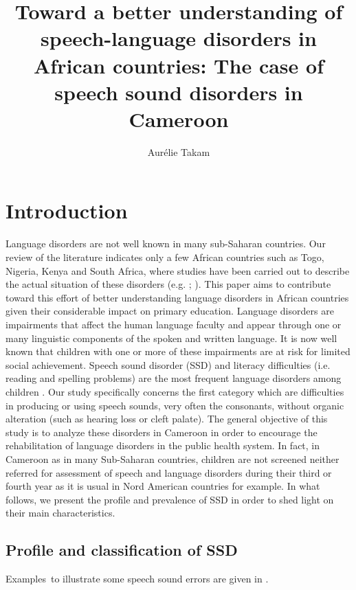 \documentclass[output=paper,newtxmath,modfonts,nonflat,draftmode]{langsci/langscibook}
\author{Aurélie Takam\affiliation{Department of African Languages and Linguistics, University of Yaoundé 1\newline Department of French studies, York University}}
\title{Toward a better understanding of speech-language disorders in African countries: The case of speech sound disorders in Cameroon}
\begin{document}
 
\maketitle


\section{Introduction} %

Language disorders are not well known in many sub-Saharan countries. Our review of the literature indicates only a few African countries such as Togo, Nigeria, Kenya and South Africa, where studies have been carried out to describe the actual situation of these disorders (e.g. \citealt{Van2016}; \citealt{Topouzkhanian2013}). This paper aims to contribute toward this effort of better understanding language disorders in African countries given their considerable impact on primary education. Language disorders are impairments that affect the human language faculty and appear through one or many linguistic components of the spoken and written language. It is now well known that children with one or more of these impairments are at risk for limited social achievement. Speech sound disorder (SSD) and literacy difficulties (i.e. reading and spelling problems) are the most frequent language disorders among children \citep{Ruscello1991}. Our study specifically concerns the first category which are difficulties in producing or using speech sounds, very often the consonants, without organic alteration (such as hearing loss or cleft palate). The general objective of this study is to analyze these disorders in Cameroon in order to encourage the rehabilitation of language disorders in the public health system. In fact, in Cameroon as in many Sub-Saharan countries, children are not screened neither referred for assessment of speech and language disorders during their third or fourth year as it is usual in Nord American countries for example. In what follows, we present the profile and prevalence of SSD in order to shed light on their main characteristics. 

\subsection{Profile and classification of SSD} %

Examples~to illustrate some speech sound errors are given in .
\end{document}
